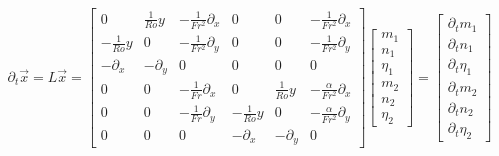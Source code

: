 \documentclass[10pt]{article}
\newcommand{\pd}[1]{\partial_{#1}}
\begin{document}
\[\pd{t}\vec{x} = L\vec{x}=
\left[\begin{array}{ccc|ccc}
0 & \frac{1}{Ro}y & -\frac{1}{Fr^2}\pd{x} & 0 & 0 & -\frac{1}{Fr^2}\pd{x} \\
-\frac{1}{Ro}y & 0 & -\frac{1}{Fr^2}\pd{y} & 0 & 0 & -\frac{1}{Fr^2}\pd{y}\\
-\pd{x} & -\pd{y} & 0 & 0 & 0 & 0 \\ \hline
0 & 0 & -\frac{1}{Fr}\pd{x} & 0 & \frac{1}{Ro}y &  -\frac{\alpha}{Fr^2}\pd{x} \\
0 & 0 & -\frac{1}{Fr}\pd{y} & -\frac{1}{Ro}y  & 0&  -\frac{\alpha}{Fr^2}\pd{y} \\
0 & 0 & 0 & -\pd{x} & -\pd{y} & 0
\end{array}\right] \begin{bmatrix}
m_1\\
n_1\\
\eta_1\\
m_2\\
n_2\\
\eta_2
\end{bmatrix} = \begin{bmatrix}
\pd{t}m_1\\
\pd{t}n_1\\
\pd{t}\eta_1\\
\pd{t}m_2\\
\pd{t}n_2\\
\pd{t}\eta_2
\end{bmatrix}
\]
\end{document}
